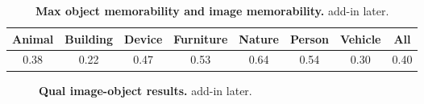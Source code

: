 \begin{table}[b]
    \begin{tabular}{cccccccc}
    \hline
    Animal & Building & Device & Furniture & Nature & Person & Vehicle & All  \\ \hline
    0.38   & 0.22     & 0.47   & 0.53      & 0.64   & 0.54   & 0.30    & 0.40 \\ \hline
    \end{tabular}
    \caption{\footnotesize\textbf{Max object memorability and image memorability.} add-in later. }\label{tab:tableMem}
\end{table}


\begin{figure}[!b]
\centering
{}
\vspace{-5mm}\caption{\footnotesize\textbf{Qual image-object results.} add-in later. }\label{fig:imMemQual}
\end{figure}



